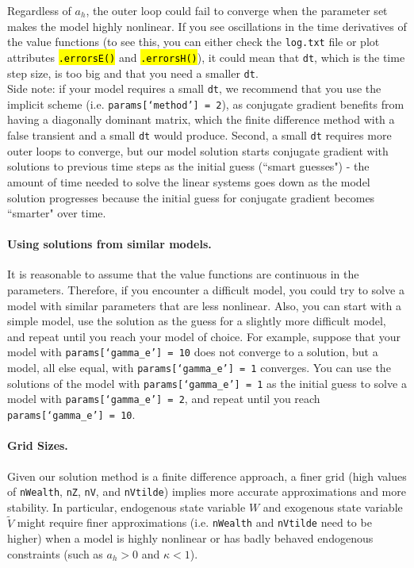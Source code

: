\documentclass[12pt]{article}
\newcommand{\wealthSymbol}{$W$\xspace}
\newcommand{\idioVolSymbol}{$\widetilde{V}$\xspace}
\newcommand{\TFPhSymbol}{$a_h$\xspace}
\newcommand{\riskAverEProg}{gamma\_e\xspace}
\newcommand{\nWealthProg}{nWealth\xspace}
\newcommand{\nGrowthProg}{nZ\xspace}
\newcommand{\nStochasaticVolProg}{nV\xspace}
\newcommand{\nIdioVolProg}{nVtilde\xspace}
\DeclareRobustCommand{\hlCODE}[1]{{\sethlcolor{backcolour}\hl{#1}}}
\begin{document}
Regardless of \TFPhSymbol, the outer loop could fail to converge when the parameter set makes the model highly nonlinear. If you see oscillations in the time derivatives of the value functions (to see this, you can either check the \texttt{log.txt} file or plot attributes \hlCODE{\texttt{.errorsE()}} and \hlCODE{\texttt{.errorsH()}}), it could mean that \texttt{dt}, which is the time step size, is too big and that you need a smaller \texttt{dt}.\\

Side note: if your model requires a small \texttt{dt}, we recommend that you use the implicit scheme (i.e. \texttt{params[`method'] = 2}), as conjugate gradient benefits from having a diagonally dominant matrix, which the finite difference method with a false transient and a small \texttt{dt} would produce. Second, a small \texttt{dt} requires more outer loops to converge, but our model solution starts conjugate gradient with solutions to previous time steps as the initial guess (``smart guesses") - the amount of time needed to solve the linear systems goes down as the model solution progresses because the initial guess for conjugate gradient becomes ``smarter" over time.

\paragraph{Using solutions from similar models.} It is reasonable to assume that the value functions are continuous in the parameters. Therefore, if you encounter a difficult model, you could try to solve a model with similar parameters that are less nonlinear. Also, you can start with a simple model, use the solution as the guess for a slightly more difficult model, and repeat until you reach your model of choice. For example, suppose that your model with \texttt{params[`\riskAverEProg'] = 10} does not converge to a solution, but a model, all else equal, with \texttt{params[`\riskAverEProg'] = 1} converges. You can use the solutions of the model with \texttt{params[`\riskAverEProg'] = 1} as the initial guess to solve a model with \texttt{params[`\riskAverEProg'] = 2}, and repeat until you reach \texttt{params[`\riskAverEProg'] = 10}.

\paragraph{Grid Sizes.} Given our solution method is a finite difference approach, a finer grid (high values of \texttt{\nWealthProg}, \texttt{\nGrowthProg}, \texttt{\nStochasaticVolProg}, and \texttt{\nIdioVolProg}) implies more accurate approximations and more stability. In particular, endogenous state variable \wealthSymbol and exogenous state variable \idioVolSymbol might require finer approximations (i.e. \texttt{\nWealthProg} and \texttt{\nIdioVolProg} need to be higher) when a model is highly nonlinear or has badly behaved endogenous constraints (such as $a_h > 0$ and $\kappa < 1$). 
\end{document}
